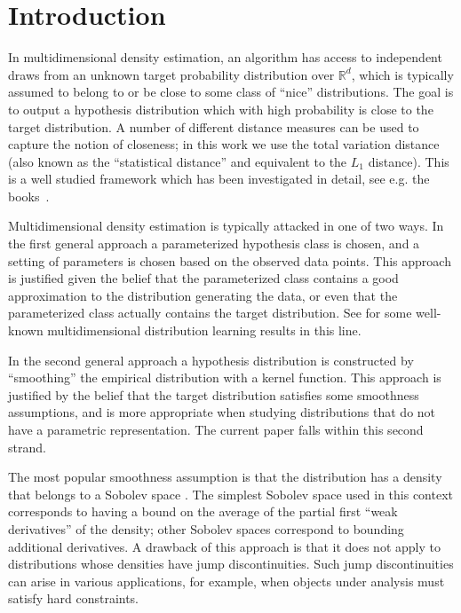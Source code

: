 
\section{Introduction}

In multidimensional density estimation, an algorithm has access to independent draws from an unknown 
target probability distribution over $\mathbb{R}^d$, which is typically assumed to belong to or be close to some class of
``nice'' distributions.  The goal is to output a hypothesis distribution which with high probability is
close to the target distribution.  A number of different distance measures can be used to capture the notion of
closeness; in this work we use the total variation distance (also known as the ``statistical distance'' 
and equivalent to the $L_1$ distance).  This is a well studied framework which has been investigated in detail, see e.g. the books~\citep{DG85,devroye2012combinatorial}.

Multidimensional density estimation 
is typically attacked in one of
two ways.  In the first general approach a parameterized hypothesis class is chosen, and a setting of parameters
is chosen based on the observed data points.  This approach is justified given the belief that the parameterized class contains
a good approximation to the distribution generating the
data, or even that the parameterized class actually contains the target distribution.  See \citep{Dasgupta:99,KMV:10,MoitraValiant:10} for some well-known multidimensional distribution learning results in this line.  

In the second general approach a hypothesis distribution is constructed by ``smoothing'' the empirical distribution with a kernel function.  This approach is justified by the belief that the target distribution satisfies some smoothness assumptions, and is more appropriate when studying distributions that do not have a parametric representation.  The current paper falls within this second strand.

The most popular smoothness assumption is that the distribution has
a density that belongs to a Sobolev space 
\citep{sobolev1963theorem,barron1991minimum,holmstrom1992asymptotic,devroye2012combinatorial}.
The simplest Sobolev space used in this context corresponds to having a bound on the average
of the partial first ``weak derivatives'' of the density; other Sobolev spaces 
correspond to bounding additional derivatives.  A drawback of this approach
is that it does not apply to distributions whose densities have jump
discontinuities. Such jump discontinuities can arise in various applications, for example, when
objects under analysis must satisfy hard constraints.

